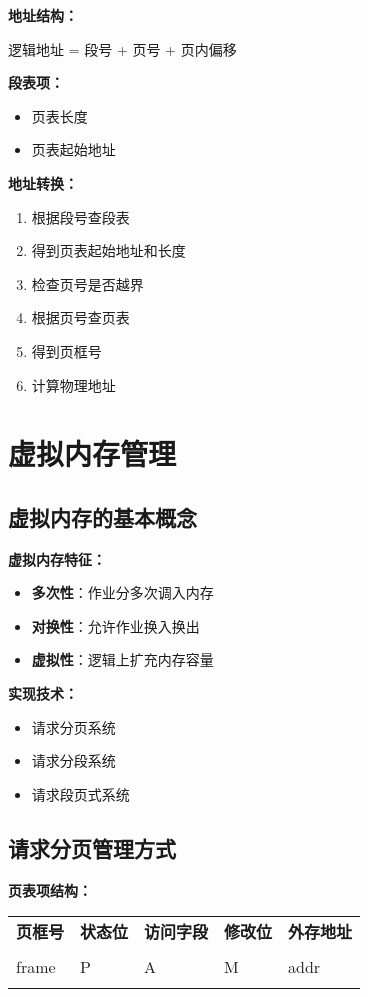 \documentclass[lang=cn,newtx,10pt,scheme=chinese]{../../elegantbook}
\begin{document}
\textbf{地址结构：}
\begin{center}
逻辑地址 = 段号 + 页号 + 页内偏移
\end{center}

\textbf{段表项：}
\begin{itemize}
  \item 页表长度
  \item 页表起始地址
\end{itemize}

\textbf{地址转换：}
\begin{enumerate}
  \item 根据段号查段表
  \item 得到页表起始地址和长度
  \item 检查页号是否越界
  \item 根据页号查页表
  \item 得到页框号
  \item 计算物理地址
\end{enumerate}

\section{虚拟内存管理}

\subsection{虚拟内存的基本概念}

\textbf{虚拟内存特征：}
\begin{itemize}
  \item \textbf{多次性}：作业分多次调入内存
  \item \textbf{对换性}：允许作业换入换出
  \item \textbf{虚拟性}：逻辑上扩充内存容量
\end{itemize}

\textbf{实现技术：}
\begin{itemize}
  \item 请求分页系统
  \item 请求分段系统
  \item 请求段页式系统
\end{itemize}

\subsection{请求分页管理方式}

\textbf{页表项结构：}
\begin{longtable}{@{}p{2cm}p{2cm}p{2cm}p{2cm}p{2cm}@{}}
\toprule
\textbf{页框号} & \textbf{状态位} & \textbf{访问字段} & \textbf{修改位} & \textbf{外存地址} \\\\ \midrule
\endhead

frame & P & A & M & addr \\\\

\bottomrule
\end{longtable}
\end{document}
